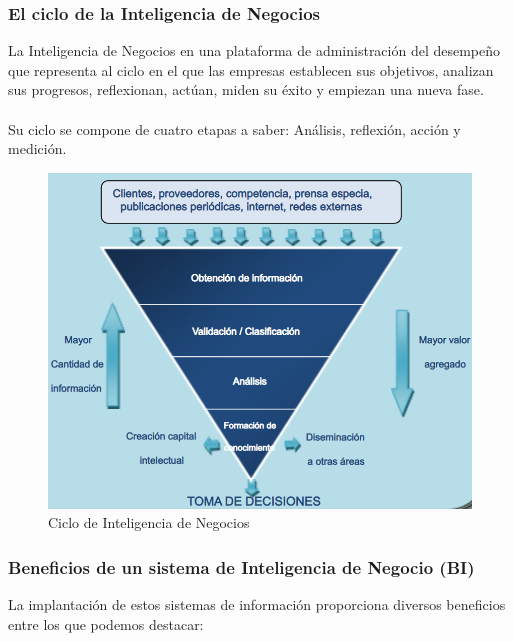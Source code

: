 \documentclass[preprint,12pt]{elsarticle}
\begin{document}

\subsubsection{\textbf{El ciclo de la Inteligencia de Negocios}}

La Inteligencia de Negocios en una plataforma de administración del desempeño que representa al ciclo en el que las empresas establecen sus objetivos, analizan sus progresos, reflexionan, actúan, miden su éxito y empiezan una nueva fase. \\ \\Su ciclo se compone de cuatro etapas a saber: Análisis, reflexión, acción y medición. \cite{referenciaestrella1}

\begin{figure}[htb]
	\begin{center}
		\includegraphics[width=12cm]{./IMAGENES/ciclo_BI} 
		\caption{Ciclo de Inteligencia de Negocios}
	\end{center}
\end{figure}

	\subsubsection{\textbf{Beneficios de un sistema de Inteligencia de Negocio (BI)}}
	La implantación de estos sistemas de información proporciona diversos beneficios entre los que podemos destacar:
\end{document}
